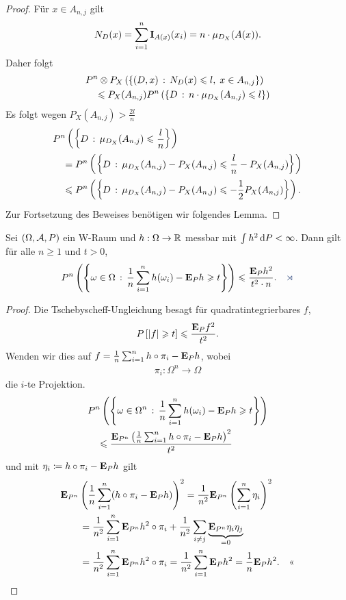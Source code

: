 \begin{proof}
Für $x\in A_{n,j}$ gilt
\begin{align*}
N_D(x) = \sum_{i=1}^n \Id_{A(x)}(x_i) = n\cdot\mu_{D_X}(A(x)).
\end{align*}
Daher folgt
\begin{align*}
&P^n\otimes P_X\left(\setdef{(D,x)}{N_D(x)\le l,\; x\in A_{n,j}} \right)\\
&\quad \le P_X(A_{n,j})P^n\left(\setdef{D}{n\cdot \mu_{D_X}(A_{n,j})\le l}
\right)
\end{align*}
Es folgt wegen $P_X(A_{n,j}) > \frac{2l}{n}$
\begin{align*}
&P^n\left(\setdef{D}{\mu_{D_X}(A_{n,j})\le \frac{l}{n}} \right)\\
&\quad =
P^n\left(\setdef{D}{\mu_{D_X}(A_{n,j}) - P_X(A_{n,j})\le \frac{l}{n}-
P_X(A_{n,j})} \right)\\
&\quad \le
P^n\left(\setdef{D}{\mu_{D_X}(A_{n,j}) - P_X(A_{n,j})\le -\frac{1}{2}
P_X(A_{n,j})} \right).
\end{align*}
Zur Fortsetzung des Beweises benötigen wir folgendes Lemma.\qedhere
\end{proof}

\begin{lem}
\label{lem:1.3.7}
Sei $(\Omega,\AA,P)$ ein W-Raum und $h:\Omega\to\R$ messbar mit
$\int h^2 \dP < \infty$. Dann gilt für alle $n\ge 1$ und $t > 0$,
\begin{align*}
P^n\left(\setdef{\omega\in\Omega}{\frac{1}{n}\sum_{i=1}^n h(\omega_i) - \E_P h
\ge t } \right) \le
\frac{\E_P h^2}{t^2\cdot n}.\fishhere
\end{align*}
\end{lem}
\begin{proof}
Die Tschebyscheff-Ungleichung besagt für quadratintegrierbares $f$,
\begin{align*}
P\left[\abs{f}\ge t\right] \le \frac{\E_P f^2}{t^2}.
\end{align*}
Wenden wir dies auf $f=\frac{1}{n}\sum_{i=1}^n h\circ\pi_i - \E_P h$, wobei
\begin{align*}
\pi_i : \Omega^n\to \Omega
\end{align*}
die $i$-te Projektion.
\begin{align*}
&P^n\left(\setdef{\omega\in\Omega^n}{\frac{1}{n}\sum_{i=1}^n h(\omega_i) - \E_P
h \ge t } \right)\\ &\quad \le
\frac{\E_{P^n}\left(\frac{1}{n} \sum_{i=1}^n h\circ\pi_i - \E_P
h\right)^2}{t^2}
\end{align*}
und mit $\eta_i \defl h\circ\pi_i - \E_P h$ gilt
\begin{align*}
&\E_{P^n}\left(\frac{1}{n}\sum_{i=1}^n (h\circ\pi_i -\E_P h) \right)^2
= \frac{1}{n^2} \E_{P^n} \left(\sum_{i=1}^n \eta_i\right)^2\\
&\qquad= \frac{1}{n^2}
\sum_{i=1}^n \E_{P^n} h^2\circ \pi_i + \frac{1}{n^2}\sum_{i\neq j} 
\underbrace{\E_{P^n} \eta_i\eta_j}_{=0}\\
&\qquad=
 \frac{1}{n^2}
\sum_{i=1}^n \E_{P^n} h^2\circ \pi_i
=
 \frac{1}{n^2}
\sum_{i=1}^n \E_{P} h^2 = \frac{1}{n} \E_{P} h^2.\qedhere
\end{align*}
\end{proof}

